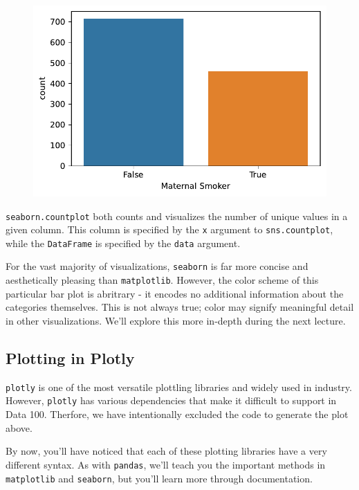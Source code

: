 \documentclass[
  letterpaper,
  DIV=11,
  numbers=noendperiod]{scrreprt}
\begin{document}
\begin{figure}[H]

{\centering \includegraphics{visualization_1/visualization_1_files/figure-pdf/cell-5-output-1.pdf}

}

\end{figure}

\texttt{seaborn.countplot} both counts and visualizes the number of
unique values in a given column. This column is specified by the
\texttt{x} argument to \texttt{sns.countplot}, while the
\texttt{DataFrame} is specified by the \texttt{data} argument.

For the vast majority of visualizations, \texttt{seaborn} is far more
concise and aesthetically pleasing than \texttt{matplotlib}. However,
the color scheme of this particular bar plot is abritrary - it encodes
no additional information about the categories themselves. This is not
always true; color may signify meaningful detail in other
visualizations. We'll explore this more in-depth during the next
lecture.

\hypertarget{plotting-in-plotly}{%
\subsection{Plotting in Plotly}\label{plotting-in-plotly}}

\texttt{plotly} is one of the most versatile plottling libraries and
widely used in industry. However, \texttt{plotly} has various
dependencies that make it difficult to support in Data 100. Therfore, we
have intentionally excluded the code to generate the plot above.

By now, you'll have noticed that each of these plotting libraries have a
very different syntax. As with \texttt{pandas}, we'll teach you the
important methods in \texttt{matplotlib} and \texttt{seaborn}, but
you'll learn more through documentation.
\end{document}
